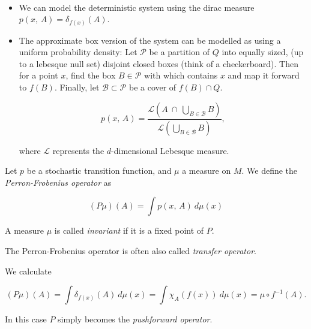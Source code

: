 \begin{example}\label{ex:q}\ 

    \begin{itemize}
        \item \cite*{attr} We can model the deterministic system using the dirac measure 
        $p(x,\, A) = \delta_{f(x)}(A)$. 
        \item The approximate box version of the system can be modelled as using a uniform 
        probability density: Let $\mathcal{P}$ be a partition of $Q$ into equally sized,
        (up to a lebesque null set) disjoint closed
        boxes (think of a checkerboard). Then for a point $x$, find the box 
        $B \in \mathcal{P}$ with which contains $x$ and map it forward to $f(B)$. Finally, let 
        $\mathcal{B} \subset \mathcal{P}$ be a cover of $f(B) \cap Q$.

        \begin{equation}
            p(x,\, A) = \frac{
                \mathcal{L} \left( A\ \cap\ \bigcup_{B \in \mathcal{B}} B \right)
            }{
                \mathcal{L} \left(\bigcup_{B \in \mathcal{B}} B \right)
            },
        \end{equation}

        where $\mathcal{L}$ represents the $d$-dimensional Lebesque measure.
    
    \end{itemize}

\end{example}

\begin{definition}
    \cite*{attr} Let $p$ be a stochastic transition function, and $\mu$ a measure on $M$. 
    We define the \emph{Perron-Frobenius operator} as
    
    \begin{equation}
        (P\mu)(A) = \int p(x,\, A)\ d\mu (x)
    \end{equation}
    
    A measure $\mu$ is called \emph{invariant} if it is a fixed point of $P$.
\end{definition}

\begin{remark}
    The Perron-Frobenius operator is often also called \emph{transfer operator}.
\end{remark}

\begin{example} 
    \cite*{attr} We calculate

    \begin{equation}
        (P\mu)(A) = \int \delta_{f(x)} (A)\ d\mu (x) 
        = \int \chi_A (f(x))\ d\mu (x) = \mu \circ f^{-1}(A).
    \end{equation}

    In this case $P$ simply becomes the \emph{pushforward operator}.
\end{example}

